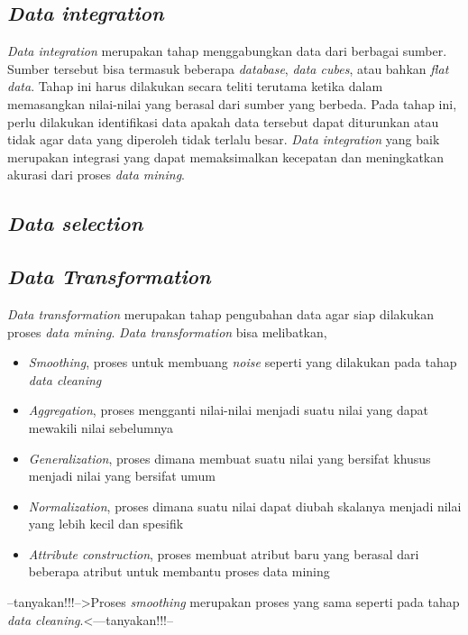 

\subsection{\textsl{Data integration}}
\textsl{Data integration} merupakan tahap menggabungkan data dari berbagai sumber. Sumber tersebut bisa termasuk beberapa \textsl{database}, \textsl{data cubes}, atau bahkan \textsl{flat data}. Tahap ini harus dilakukan secara teliti terutama ketika dalam memasangkan nilai-nilai yang berasal dari sumber yang berbeda. Pada tahap ini, perlu dilakukan identifikasi data apakah data tersebut dapat diturunkan atau tidak agar data yang diperoleh tidak terlalu besar.
\textsl{Data integration} yang baik merupakan integrasi yang dapat memaksimalkan kecepatan dan meningkatkan akurasi dari proses \textsl{data mining}. 

\subsection{\textsl{Data selection}}


\subsection{\textsl{Data Transformation}}
\textsl{Data transformation} merupakan tahap pengubahan data agar siap dilakukan proses \textsl{data mining}. \textsl{Data transformation} bisa melibatkan,
	\begin{itemize}
		\item \textsl{Smoothing}, proses untuk membuang \textsl{noise} seperti yang dilakukan pada tahap \textsl{data cleaning}
		\item \textsl{Aggregation}, proses mengganti nilai-nilai menjadi suatu nilai yang dapat mewakili nilai sebelumnya
		\item \textsl{Generalization}, proses dimana membuat suatu nilai yang bersifat khusus menjadi nilai yang bersifat umum
		\item \textsl{Normalization}, proses dimana suatu nilai dapat diubah skalanya menjadi nilai yang lebih kecil dan spesifik
		\item \textsl{Attribute construction}, proses membuat atribut baru yang berasal dari beberapa atribut untuk membantu proses data mining
	\end{itemize}
--tanyakan!!!-->Proses \textsl{smoothing} merupakan proses yang sama seperti pada tahap \textsl{data cleaning}.<---tanyakan!!!--

